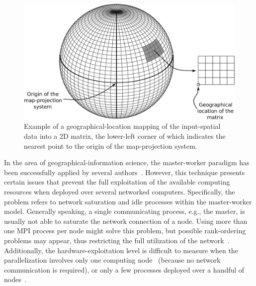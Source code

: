 \begin{figure}
\centering

\includegraphics[width=1\textwidth]{04-framework_design_and_implementation/img/spatial_data_projection}

\caption{Example of a geographical-location mapping of the input-spatial data
into a 2D matrix, the lower-left corner of which indicates the nearest
point to the origin of the map-projection system.\label{fig:04-Spatial_data_location_mapping}}
\end{figure}


In the area of geographical-information science, the master-worker
paradigm has been successfully applied by several authors~\cite{Akhter-GRASS_GIS_on_high_performance_computing_with_MPI_OpenMP_and_Ninf-G:2010,Akhter_Porting_GRASS_raster_module_to_distributed_computing:2007,Campos_Parallel_modelling_in_GIS:2012,Guan_A_parallel_computing_approach_to_fast_geostatistical_areal_interpolation:2011,Huang-Explorations_of_the_implementation_of_a_parallel_IDW_algorithm_in_a_Linux_cluster:2011,Tabik-High_performance_three_horizon_composition_algorithm_for_large_scale_terrains:2011,Tabik-Optimal_tilt_and_orientation_maps_a_multi_algorithm_approach_for_heterogeneous_multicore_GPU_systems:2013}.
However, this technique presents certain issues that prevent the full
exploitation of the available computing resources when deployed over
several networked computers. Specifically, the problem refers to network
saturation and idle processes within the master-worker model. Generally
speaking, a single communicating process, e.g., the master, is usually
not able to saturate the network connection of a node. Using more
than one MPI process per node might solve this problem, but possible
rank-ordering problems may appear, thus restricting the full utilization
of the network~\cite{Rabenseifner-Hybrid_MPI_OpenMP_parallel_programming_on_clusters_of_multicore_nodes:2009}.
Additionally, the hardware-exploitation level is difficult to measure
when the parallelization involves only one computing node~\cite{Tabik-High_performance_three_horizon_composition_algorithm_for_large_scale_terrains:2011,Tabik-Optimal_tilt_and_orientation_maps_a_multi_algorithm_approach_for_heterogeneous_multicore_GPU_systems:2013}
(because no network communication is required), or only a few processes
deployed over a handful of nodes~\cite{Huang-Explorations_of_the_implementation_of_a_parallel_IDW_algorithm_in_a_Linux_cluster:2011}. 

